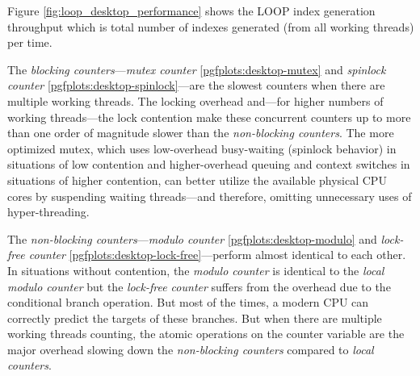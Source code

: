 \begin{@empty}
    Figure \ref{fig:loop_desktop_performance} shows the LOOP index generation throughput which is total number of indexes generated (from all working threads) per time.


    The \emph{blocking counters}---\emph{mutex counter} \ref{pgfplots:desktop-mutex} and \emph{spinlock counter} \ref{pgfplots:desktop-spinlock}---are the slowest counters when there are multiple working threads. The locking overhead and---for higher numbers of working threads---the lock contention make these concurrent counters up to more than one order of magnitude slower than the \emph{non-blocking counters}. The more optimized mutex, which uses low-overhead busy-waiting (spinlock behavior) in situations of low contention and higher-overhead queuing and context switches in situations of higher contention, can better utilize the available physical CPU cores by suspending waiting threads---and therefore, omitting unnecessary uses of hyper-threading.

    The \emph{non-blocking counters}---\emph{modulo counter} \ref{pgfplots:desktop-modulo} and \emph{lock-free counter} \ref{pgfplots:desktop-lock-free}---perform almost identical to each other. In situations without contention, the \emph{modulo counter} is identical to the \emph{local modulo counter} but the \emph{lock-free counter} suffers from the overhead due to the conditional branch operation. But most of the times, a modern CPU can correctly predict the targets of these branches. But when there are multiple working threads counting, the atomic operations on the counter variable are the major overhead slowing down the \emph{non-blocking counters} compared to \emph{local counters}.


\end{@empty}
